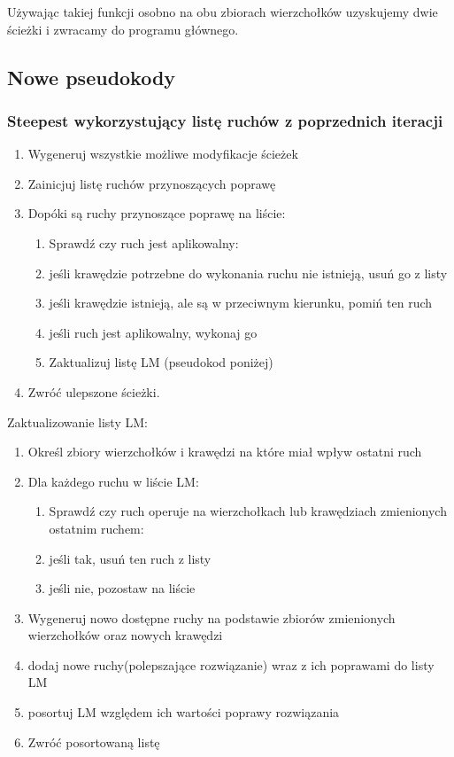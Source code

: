 \documentclass[11pt]{article}
\begin{document}
Używając takiej funkcji osobno na obu zbiorach wierzchołków uzyskujemy dwie ścieżki i zwracamy do programu głównego.

\subsection{Nowe pseudokody}\label{subsec:nowe-pseudokody}

\subsubsection{Steepest wykorzystujący listę ruchów z poprzednich iteracji}

\begin{enumerate}
  \item Wygeneruj wszystkie możliwe modyfikacje ścieżek
  \item Zainicjuj listę ruchów przynoszących poprawę
  \item Dopóki są ruchy przynoszące poprawę na liście:
  \begin{enumerate}
      \item Sprawdź czy ruch jest aplikowalny:
      \item jeśli krawędzie potrzebne do wykonania ruchu nie istnieją, usuń go z listy
      \item jeśli krawędzie istnieją, ale są w przeciwnym kierunku, pomiń ten ruch
      \item jeśli ruch jest aplikowalny, wykonaj go
      \item Zaktualizuj listę LM (pseudokod poniżej)
  \end{enumerate}
  \item Zwróć ulepszone ścieżki.
\end{enumerate}


Zaktualizowanie listy LM:
\begin{enumerate}
  \item Określ zbiory wierzchołków i krawędzi na które miał wpływ ostatni ruch
  \item Dla każdego ruchu w liście LM:
  \begin{enumerate}
      \item Sprawdź czy ruch operuje na wierzchołkach lub krawędziach zmienionych ostatnim ruchem:
      \item jeśli tak, usuń ten ruch z listy
      \item jeśli nie, pozostaw na liście
  \end{enumerate}
  \item Wygeneruj nowo dostępne ruchy na podstawie zbiorów zmienionych wierzchołków oraz nowych krawędzi
    \item dodaj nowe ruchy(polepszające rozwiązanie) wraz z ich poprawami do listy LM
    \item posortuj LM względem ich wartości poprawy rozwiązania
    \item Zwróć posortowaną listę

\end{enumerate}
\end{document}

